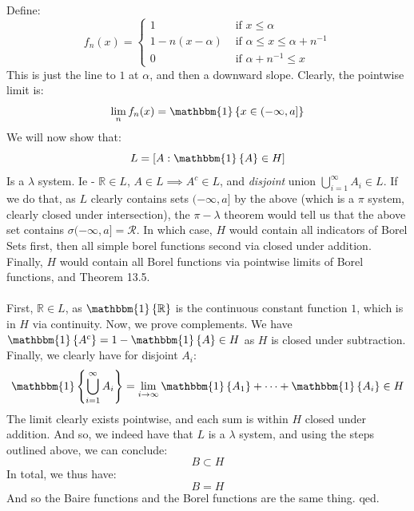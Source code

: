 \documentclass[12pt,a4paper]{article}
\newcommand{\1}[1]{\mathbbm{1}\left\{ #1 \right\}}
\newcommand{\R}{\mathbb{R}}
\newcommand{\rcal}{\mathcal{R}}
\begin{document}
\\\\
Define:
$$
	f_n(x) = \begin{cases}
	1 & \text{ if $x \leq \alpha$}\\
	1 - n(x-\alpha) & \text{ if $\alpha \leq x \leq \alpha + n^{-1}$}\\
	0 & \text{ if $\alpha + n^{-1} \leq x$}
	\end{cases}
$$
This is just the line to $1$ at $\alpha$, and then a downward slope. Clearly, the pointwise limit is:
$$
	\lim_n f_n(x) = \1{x \in (-\infty,a]}
$$
We will now show that:
$$
	L = \left[A : \1{A} \in H\right]
$$
Is a $\lambda$ system. Ie - $\R \in L$, $A \in L \implies A^c \in L$, and \textit{disjoint} union $\bigcup_{i=1}^\infty A_i \in L$. If we do that, as $L$ clearly contains sets $(-\infty,a]$ by the above (which is a $\pi$ system, clearly closed under intersection), the $\pi-\lambda$ theorem would tell us that the above set contains $\sigma(-\infty,a] = \rcal$. In which case, $H$ would contain all indicators of Borel Sets first, then all simple borel functions second via closed under addition. Finally, $H$ would contain all Borel functions via pointwise limits of Borel functions, and Theorem 13.5.
\\\\
First, $\R \in L$, as $\1{\R}$ is the continuous constant function $1$, which is in $H$ via continuity. Now, we prove complements. We have $\1{A^c} = 1 - \1{A} \in H$ as $H$ is closed under subtraction. Finally, we clearly have for disjoint $A_i$:
$$
	\1{\bigcup_{i=1}^\infty A_i} = \lim_{i \to \infty} \1{A_1} + \cdots + \1{A_i} \in H
$$
The limit clearly exists pointwise, and each sum is within $H$ closed under addition. And so, we indeed have that $L$ is a $\lambda$ system, and using the steps outlined above, we can conclude:
$$
	B \subset H
$$
In total, we thus have:
$$
	B = H
$$
And so the Baire functions and the Borel functions are the same thing. qed.
\end{document}
